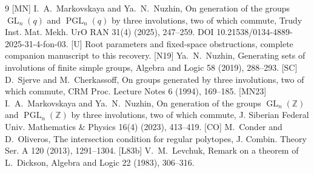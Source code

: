 \documentclass[11pt]{article}
\newcommand{\GL}{\operatorname{GL}}\newcommand{\SL}{\operatorname{SL}}
\newcommand{\PGL}{\operatorname{PGL}}\newcommand{\PSL}{\operatorname{PSL}}
\begin{document}
\begin{thebibliography}{9}\small
{}[MN] I.~A.~Markovskaya and Ya.~N.~Nuzhin,
On generation of the groups $\GL_n(q)$ and $\PGL_n(q)$ by three involutions,
two of which commute, Trudy Inst. Mat. Mekh. UrO RAN 31(4) (2025),
247--259. DOI 10.21538/0134-4889-2025-31-4-fon-03.
[U] Root parameters and fixed-space obstructions, complete
companion manuscript to this recovery.
[N19] Ya.~N.~Nuzhin, Generating sets of involutions of finite
simple groups, Algebra and Logic 58 (2019), 288--293.
[SC] D.~Sjerve and M.~Cherkassoff, On groups generated by three
involutions, two of which commute, CRM Proc. Lecture Notes 6 (1994),
169--185.
[MN23] I.~A.~Markovskaya and Ya.~N.~Nuzhin, On generation
of the groups $\GL_n(\mathbb Z)$ and $\PGL_n(\mathbb Z)$ by three
involutions, two of which commute, J. Siberian Federal Univ.
Mathematics \& Physics 16(4) (2023), 413--419.
[CO] M.~Conder and D.~Oliveros, The intersection condition
for regular polytopes, J. Combin. Theory Ser. A 120 (2013), 1291--1304.
[L83b] V.~M.~Levchuk, Remark on a theorem of L.~Dickson,
Algebra and Logic 22 (1983), 306--316.
\end{thebibliography}
\end{document}
